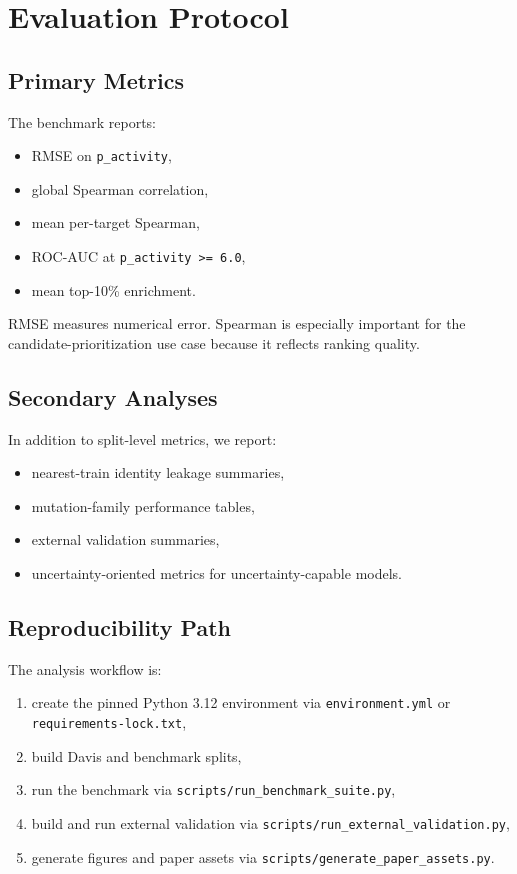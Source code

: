 \documentclass[11pt]{article}
\begin{document}
\section{Evaluation Protocol}

\subsection{Primary Metrics}

The benchmark reports:

\begin{itemize}[leftmargin=1.5em]
  \item RMSE on \texttt{p\_activity},
  \item global Spearman correlation,
  \item mean per-target Spearman,
  \item ROC-AUC at \texttt{p\_activity >= 6.0},
  \item mean top-10\% enrichment.
\end{itemize}

RMSE measures numerical error. Spearman is especially important for the
candidate-prioritization use case because it reflects ranking quality.

\subsection{Secondary Analyses}

In addition to split-level metrics, we report:

\begin{itemize}[leftmargin=1.5em]
  \item nearest-train identity leakage summaries,
  \item mutation-family performance tables,
  \item external validation summaries,
  \item uncertainty-oriented metrics for uncertainty-capable models.
\end{itemize}

\subsection{Reproducibility Path}

The analysis workflow is:

\begin{enumerate}[leftmargin=1.5em]
  \item create the pinned Python 3.12 environment via
  \texttt{environment.yml} or \texttt{requirements-lock.txt},
  \item build Davis and benchmark splits,
  \item run the benchmark via \texttt{scripts/run\_benchmark\_suite.py},
  \item build and run external validation via
  \texttt{scripts/run\_external\_validation.py},
  \item generate figures and paper assets via
  \texttt{scripts/generate\_paper\_assets.py}.
\end{enumerate}
\end{document}
